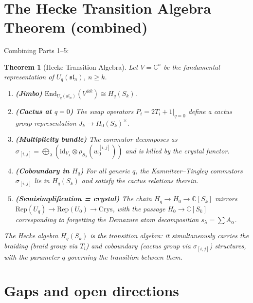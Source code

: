 \documentclass[11pt]{article}
\newtheorem{theorem}{Theorem}
\theoremstyle{remark}
\newcommand{\CC}{\mathbb{C}}
\newcommand{\Rep}{\mathrm{Rep}}
\newcommand{\Crys}{\mathrm{Crys}}
\newcommand{\End}{\mathrm{End}}
\newcommand{\id}{\mathrm{id}}
\begin{document}
\section{The Hecke Transition Algebra Theorem (combined)}
\label{sec:combined}

Combining Parts 1--5:

\begin{theorem}[Hecke Transition Algebra]
\label{thm:main}
Let $V = \CC^n$ be the fundamental representation of $U_q(\mathfrak{sl}_n)$, $n \ge k$.
\begin{enumerate}
  \item \textbf{(Jimbo)} $\End_{U_q(\mathfrak{sl}_n)}(V^{\otimes k}) \cong H_q(S_k)$.
  \item \textbf{(Cactus at $q=0$)} The swap operators $P_i = 2T_i + 1\big|_{q=0}$
    define a cactus group representation $J_k \to H_0(S_k)^\times$.
  \item \textbf{(Multiplicity bundle)} The commutor decomposes as
    $\sigma_{[i,j]} = \bigoplus_\lambda (\id_{V_\lambda} \otimes \rho_{S_\lambda}(w_0^{[i,j]}))$
    and is killed by the crystal functor.
  \item \textbf{(Coboundary in $H_q$)} For all generic $q$, the Kamnitzer--Tingley
    commutors $\sigma_{[i,j]}$ lie in $H_q(S_k)$ and satisfy the cactus relations therein.
  \item \textbf{(Semisimplification = crystal)} The chain
    $H_q \to H_0 \to \CC[S_k]$ mirrors
    $\Rep(U_q) \to \Rep(U_0) \to \Crys$,
    with the passage $H_0 \to \CC[S_k]$ corresponding to
    forgetting the Demazure atom decomposition $s_\lambda = \sum A_\alpha$.
\end{enumerate}
The Hecke algebra $H_q(S_k)$ is the \emph{transition algebra}: it simultaneously
carries the braiding (braid group via $T_i$) and coboundary (cactus group via
$\sigma_{[i,j]}$) structures, with the parameter $q$ governing the transition
between them.
\end{theorem}

\section{Gaps and open directions}
\label{sec:gaps}
\end{document}
